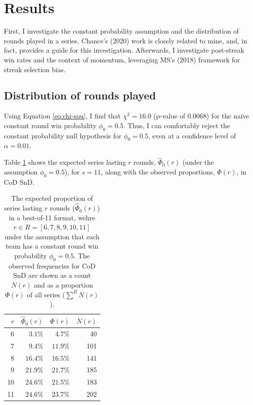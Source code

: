\documentclass{article}
\begin{document}
\hypertarget{results}{%
\section{Results}\label{results}}

First, I investigate the constant probability assumption and the
distribution of rounds played in a series. Chance's (2020) work is
closely related to mine, and, in fact, provides a guide for this
investigation. Afterwards, I investigate post-streak win rates and the
context of momentum, leveraging MS's (2018) framework for streak
selection bias.

\hypertarget{sec:results-rounds-played}{%
\subsection{Distribution of rounds
played}\label{sec:results-rounds-played}}

Using Equation \ref{eq:chi-squ}, I find that \(\chi^2 = 16.0\) (p-value
of 0.0068) for the naive constant round win probability
\(\phi_0 = 0.5\). Thus, I can comfortably reject the constant
probability null hypothesis for \(\phi_0 = 0.5\), even at a confidence
level of \(\alpha = 0.01\).

Table \ref{tbl:cod-prob-series-lasting-r-rounds} shows the expected
series lasting \(r\) rounds, \(\hat{\Phi}_0(r)\) (under the assumption
\(\phi_0 = 0.5\)), for \(s = 11\), along with the observed proportions,
\(\Phi(r)\), in CoD SnD.

\begin{longtable}{rrrr}
\caption{The expected proportion of series lasting $r$ rounds ($\hat{\Phi}_0(r)$) in a best-of-11 format, wehre $r \in R = [6, 7, 8, 9, 10, 11]$ under the assumption that each team has a constant round win probability $\phi_0 = 0.5$. The observed frequencies for CoD SnD are shown as a count $N(r)$ and as a proportion $\Phi(r)$ of all series ($\sum^R N(r)$).}\label{tbl:cod-prob-series-lasting-r-rounds} \\
\toprule
$r$ & $\hat{\Phi}_0(r)$ & $\Phi(r)$ & $N(r)$ \\ 
\midrule
6 & $3.1\%$ & $4.7\%$ & 40 \\ 
7 & $9.4\%$ & $11.9\%$ & 101 \\ 
8 & $16.4\%$ & $16.5\%$ & 141 \\ 
9 & $21.9\%$ & $21.7\%$ & 185 \\ 
10 & $24.6\%$ & $21.5\%$ & 183 \\ 
11 & $24.6\%$ & $23.7\%$ & 202 \\ 
\bottomrule
\end{longtable}
\end{document}
